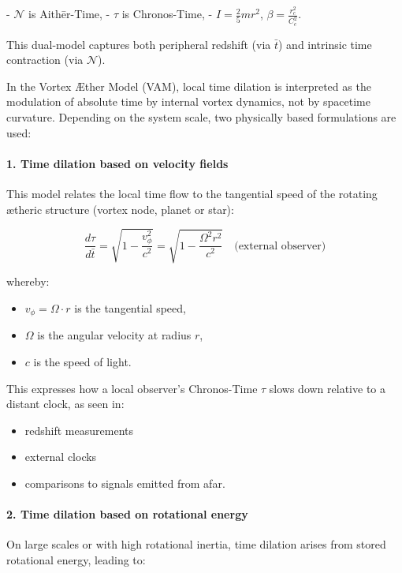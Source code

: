\documentclass[preprint]{revtex4-2}
\begin{document}
- \( \mathcal{N} \) is Aithēr-Time,
- \( \tau \) is Chronos-Time,
- \( I = \frac{2}{5} m r^2 \), \( \beta = \frac{r_c^2}{C_e^2} \).

This dual-model captures both peripheral redshift (via \( \bar{t} \)) and intrinsic time contraction (via \( \mathcal{N} \)).


In the Vortex Æther Model (VAM), local time dilation is interpreted as the modulation of absolute time by internal vortex dynamics, not by spacetime curvature. Depending on the system scale, two physically based formulations are used:

\paragraph{1. Time dilation based on velocity fields}

This model relates the local time flow to the tangential speed of the rotating ætheric structure (vortex node, planet or star):

\begin{equation}
    \frac{d\tau}{d\bar{t}} =
    \sqrt{1 - \frac{v_\phi^2}{c^2}} =
    \sqrt{1 - \frac{\Omega^2 r^2}{c^2}} \quad \text{(external observer)}
\end{equation}

whereby:
\begin{itemize}
    \item \( v_\phi = \Omega \cdot r \) is the tangential speed,
    \item \( \Omega \) is the angular velocity at radius \( r \),
    \item \( c \) is the speed of light.
\end{itemize}

This expresses how a local observer's Chronos-Time $\tau$ slows down relative to a distant clock, as seen in:
\begin{itemize}
\item redshift measurements
\item external clocks
\item comparisons to signals emitted from afar.
\end{itemize}



\paragraph{2. Time dilation based on rotational energy}

On large scales or with high rotational inertia, time dilation arises from stored rotational energy, leading to:
\end{document}
